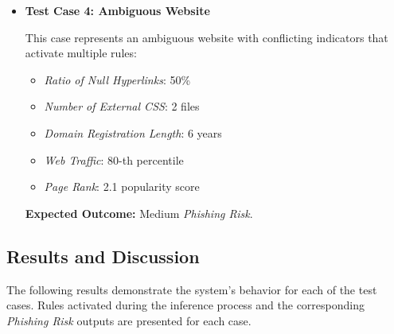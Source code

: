 \documentclass{article}
\begin{document}
\begin{itemize}
    \item \textbf{Test Case 4: Ambiguous Website}
    
    This case represents an ambiguous website with conflicting indicators that activate multiple rules:
    \begin{itemize}
        \item \textit{Ratio of Null Hyperlinks}: 50\%
        \item \textit{Number of External CSS}: 2 files
        \item \textit{Domain Registration Length}: 6 years
        \item \textit{Web Traffic}: 80-th percentile
        \item \textit{Page Rank}: 2.1 popularity score
    \end{itemize}
    \textbf{Expected Outcome:} Medium \textit{Phishing Risk}.
\end{itemize}

\subsection{Results and Discussion}


The following results demonstrate the system's behavior for each of the test cases. Rules activated during the inference process and the corresponding \textit{Phishing Risk} outputs are presented for each case.  
\end{document}
